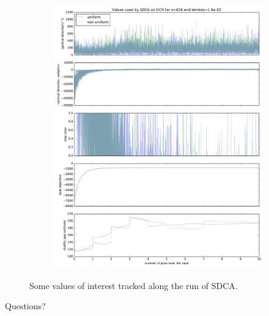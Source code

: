 \documentclass{beamer}
\DeclareMathOperator{\1}{\mathbb{1}}
\begin{document}
\begin{frame}
\begin{figure}
\begin{subfigure}[t]{0.3\textwidth}
        \includegraphics[width=\textwidth]{images/20170914_040717_ocr_annex}
    \end{subfigure}
    \caption{Some values of interest tracked along the run of SDCA.}
	\label{ocr annexes}
\end{figure}
\end{frame}
\begin{frame}
\Huge{\centerline{Questions?}}
\end{frame}
\begin{frame}
	\printbibliography
\end{frame}
\appendix
\end{document}
